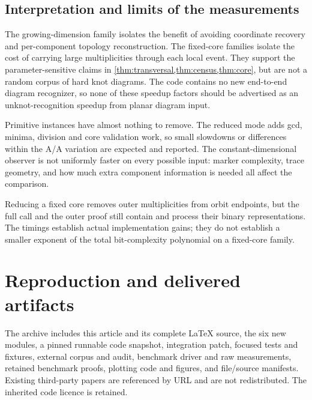

\subsection{Interpretation and limits of the measurements}

The growing-dimension family isolates the benefit of avoiding coordinate
recovery and per-component topology reconstruction. The fixed-core families
isolate the cost of carrying large multiplicities through each local event.
They support the parameter-sensitive claims in
\cref{thm:transversal,thm:census,thm:core}, but are not a random corpus of
hard knot diagrams. The code contains no new end-to-end diagram recognizer,
so none of these speedup factors should be advertised as an unknot-recognition
speedup from planar diagram input.

Primitive instances have almost nothing to remove. The reduced mode adds
gcd, minima, division and core validation work, so small slowdowns or
differences within the A/A variation are expected and reported. The
constant-dimensional observer is not uniformly faster on every possible
input: marker complexity, trace geometry, and how much extra component
information is needed all affect the comparison.

Reducing a fixed core removes outer multiplicities from orbit endpoints,
but the full call and the outer proof still contain and process their
binary representations. The timings establish actual implementation gains;
they do not establish a smaller exponent of the total bit-complexity
polynomial on a fixed-core family.

\section{Reproduction and delivered artifacts}
\label{sec:reproduce}

The archive includes this article and its complete LaTeX source, the six
new modules, a pinned runnable code snapshot, integration patch, focused
tests and fixtures, external corpus and audit, benchmark driver and raw
measurements, retained benchmark proofs, plotting code and figures, and
file/source manifests. Existing third-party papers are referenced by URL
and are not redistributed. The inherited code licence is retained.

